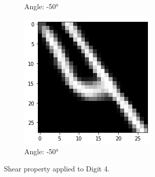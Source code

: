 \begin{figure}[!htbp]
\begin{subfigure}[b]{.3\textwidth}
            \caption{Angle: \ang{-50}}
            \label{fig:Rotate-misclass0}
        \end{subfigure}%
        \begin{subfigure}[b]{.3\textwidth}
            \includegraphics[width=\linewidth]{images/shear3.png}
            \caption{Angle: \ang{-50}}
            \label{fig:Rotate-misclass0}
        \end{subfigure}
        
        \caption{Shear property applied to Digit 4.}
        \label{fig:Rotate-misclassifications}
    \end{figure}
    \FloatBarrier
    
